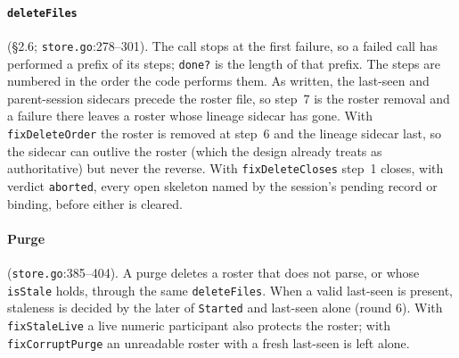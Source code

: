 \documentclass[a4paper,10pt,fleqn]{article}
\newcommand{\fpath}[1]{\texttt{#1}}
\newcommand{\field}[1]{\texttt{#1}}
\begin{document}
\paragraph{\field{deleteFiles}} (\S2.6; \fpath{store.go}:278--301). The call
stops at the first failure, so a failed call has performed a prefix of its
steps; \field{done?} is the length of that prefix. The steps are numbered
in the order the code performs them. As written, the last-seen and
parent-session sidecars precede the roster file, so step~7 is the roster
removal and a failure there leaves a roster whose lineage sidecar has gone.
With \field{fixDeleteOrder} the roster is removed at step~6 and the
lineage sidecar last, so the sidecar can outlive the roster (which the
design already treats as authoritative) but never the reverse. With
\field{fixDeleteCloses} step~1 closes, with verdict \field{aborted}, every
open skeleton named by the session's pending record or binding, before
either is cleared.

\paragraph{Purge} (\fpath{store.go}:385--404). A purge deletes a roster that
does not parse, or whose \field{isStale} holds, through the same
\field{deleteFiles}. When a valid last-seen is present, staleness is decided
by the later of \field{Started} and last-seen alone (round 6). With
\field{fixStaleLive} a live numeric participant also protects the roster;
with \field{fixCorruptPurge} an unreadable roster with a fresh last-seen is
left alone.
\end{document}
